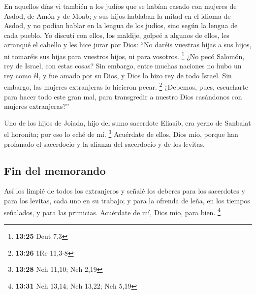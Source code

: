  En aquellos días vi también a los judíos que se habían
casado con mujeres de Asdod, de Amón y de Moab;  y sus
hijos hablaban la mitad en el idioma de Asdod, y no podían hablar en la
lengua de los judíos, sino según la lengua de cada pueblo.
 Yo discutí con ellos, los maldije, golpeé a algunos de
ellos, les arranqué el cabello y les hice jurar por Dios: ``No daréis
vuestras hijas a sus hijos, ni tomaréis sus hijas para vuestros hijos,
ni para vosotros. \footnote{\textbf{13:25} Deut 7,3}  ¿No
pecó Salomón, rey de Israel, con estas cosas? Sin embargo, entre muchas
naciones no hubo un rey como él, y fue amado por su Dios, y Dios lo hizo
rey de todo Israel. Sin embargo, las mujeres extranjeras lo hicieron
pecar. \footnote{\textbf{13:26} 1Re 11,3-8}  ¿Debemos,
pues, escucharte para hacer todo este gran mal, para transgredir a
nuestro Dios casándonos con mujeres extranjeras?''

 Uno de los hijos de Joiada, hijo del sumo sacerdote
Eliasib, era yerno de Sanbalat el horonita; por eso lo eché de mí.
\footnote{\textbf{13:28} Neh 11,10; Neh 2,19}  Acuérdate
de ellos, Dios mío, porque han profanado el sacerdocio y la alianza del
sacerdocio y de los levitas.

\hypertarget{fin-del-memorando}{%
\subsection{Fin del memorando}\label{fin-del-memorando}}

 Así los limpié de todos los extranjeros y señalé los
deberes para los sacerdotes y para los levitas, cada uno en su trabajo;
 y para la ofrenda de leña, en los tiempos señalados, y
para las primicias. Acuérdate de mí, Dios mío, para bien. \footnote{\textbf{13:31}
  Neh 13,14; Neh 13,22; Neh 5,19}
